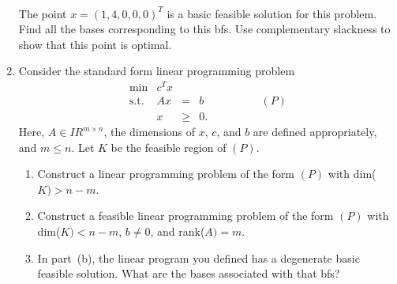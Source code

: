 \documentclass[11pt]{article}
\newcommand{\real}{I\!\! R}
\begin{document}
\begin{enumerate}
\begin{displaymath}
\begin{array}{lcccccrcrcl}
          \end{array}
         \end{displaymath}
         The point $x=(1,4,0,0,0)^T$ is a basic feasible solution for this
         problem. Find all the bases corresponding to this bfs.
         Use complementary slackness to show that this point is optimal.
   \item
Consider the standard form linear programming problem
\begin{displaymath}
  \begin{array}{lrclr}
      \min  &  c^Tx  &   &    \\
      \mbox{s.t. }  &  Ax  &  =  &  b  & \qquad \qquad  (P) \\
                    &   x  & \geq & 0.
  \end{array}
\end{displaymath}
Here, $A \in {\real}^{m \times n}$, the dimensions of $x$, $c$, and $b$
are defined appropriately, and $m \leq n$.
Let $K$ be the feasible region of $(P)$.
         \begin{enumerate}
            \item Construct a linear programming problem of the form $(P)$
              with dim($K)>n-m$.
            \item Construct a feasible
              linear programming problem of the form $(P)$
              with dim($K)<n-m$, $b \neq 0$, and rank($A)=m$.
            \item In part~(b),
              the linear program you defined has
              a degenerate basic feasible solution.
              What are the bases associated with that bfs?
         \end{enumerate}

\end{enumerate}
\end{document}
